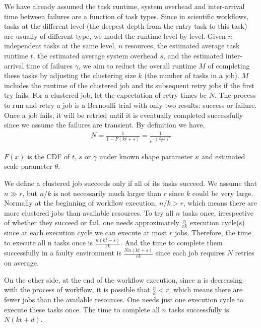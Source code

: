 \documentclass{IOS-Book-Article}
\begin{document}
We have already assumed the task runtime, system overhead and inter-arrival time between failures are a function of task types. Since in scientific workflows, tasks at the different level (the deepest depth from the entry task to this task) are usually of different type, we model the runtime level by level. Given $n$ independent tasks at the same level, $n$ resources, the estimated average task runtime $t$, the estimated average system overhead $s$, and the estimated inter-arrival time of failures $\gamma$, we aim to reduct the overall runtime $M$ of completing these tasks by adjusting the clustering size $k$ (the number of tasks in a job). 
$M$ includes the runtime of the clustered job and its subsequent retry jobs if the first try fails. For a clustered job, let the expectation of retry times be $N$. The process to run and retry a job is a Bernoulli trial with only two results: success or failure. Once a job fails, it will be retried until it is eventually completed successfully since we assume the failures are transient. By definition we have, 
\begin{eqnarray}
\displaystyle
N=\frac{1}{1-F(kt+s)}=\frac{1}{e^{-(\displaystyle\frac{kt+d}{\theta})^{\kappa}}} \nonumber
\end{eqnarray}

$F(x)$ is the CDF of $t$, $s$ or $\gamma$ under known shape parameter $\kappa$ and estimated scale parameter $\theta$. 

We define a clustered job succeeds only if all of its tasks succeed. We assume that $n \gg r$, but $n/k$ is not necessarily much larger than $r$ since $k$ could be very large. Normally at the beginning of workflow execution, $n/k > r$, which means there are more clustered jobs than available resources. To try all $n$ tasks once, irrespective of whether they succeed or fail, one needs approximately $\displaystyle \frac{n}{rk}$ execution cycle(s) since at each execution cycle we can execute at most $r$ jobs. Therefore, the time to execute all n tasks once is $\displaystyle\frac{n(kt+s)}{rk}$. And the time to complete them successfully in a faulty environment is $\displaystyle\frac{Nn(kt+s)}{rk} $ since each job requires $N$ retries on average.  

On the other side, at the end of the workflow execution, since n is decreasing with the process of workflow, it is possible that $\displaystyle \frac{n}{k} < r$, which means there are fewer jobs than the available resources. One needs just one execution cycle to execute these tasks once. The time to complete all $n$ tasks successfully is $N(kt+d)$. 
\end{document}
